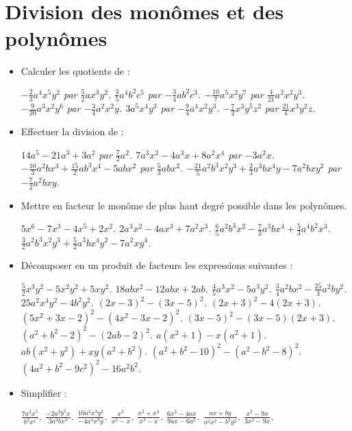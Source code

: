 \chapter{Division des monômes et des polynômes}

\begin{itemize}
\item Calculer les quotients de : 
\begin{itemize}
\it $-\frac23a^4x^5y^2$ par $\frac52ax^3y^2$.
\it $\frac35a^4b^2c^5$ par $-\frac34ab^2c^3$.
\it $-\frac{10}7a^5x^2y^7$ par $\frac{4}{21}a^2x^2y^3$. 
\it $-\frac9{20}a^3x^2y^6$ par $-\frac34a^2x^2y$.
\it $3a^5x^4y^3$ par $-\frac94a^4x^2y^3$. 
\it $-\frac72x^3y^5z^2$ par $\frac{21}4x^3y^2z$. 
\end{itemize}
\item Effectuer la division de : \begin{itemize}
\it $14a^5-21a^3+3a^2$ par $\frac72a^2$. 
\it $7a^3x^2-4a^3x+8a^2x^4$ par $-3a^2x$.
\it $-\frac{10}3 a^2bx^3+\frac{15}2ab^3x^4-5abx^2$ par $\frac53abx^2$.
\it $-\frac{21}5a^2b^3x^2y^3+\frac23a^3bx^4y-7a^2bxy^2$
par $-\frac72a^2bxy$.
\end{itemize}
\item Mettre en facteur le monôme de plus haut degré possible dans les polynômes. 
\begin{itemize}
\it $5x^6-7x^3-4x^5+2x^2$.
\it $2a^3x^2-4ax^3+7a^2x^3$.
\it $\frac65a^2b^3x^2-\frac72a^3bx^4+\frac53a^4b^2x^3$.
\it $\frac32a^2b^3x^2y^3+\frac52a^3bx^4y^2-7a^2xy^4$.
\end{itemize}
\item Décomposer en un produit de facteurs les expressions suivantes : 
\begin{itemize}
\it $\frac52x^3y^2-5x^2y^2+5xy^2$.
\it $18abx^2-12abx+2ab$.
\it $\frac45a^3x^2-5a^3y^2$.
\it $\frac34a^2bx^2-\frac{25}3a^2by^2$.
\it $25a^2x^4y^2-4b^2y^2$.
\it $(2x-3)^2-(3x-5)^2$.
\it $(2x+3)^2-4(2x+3)$.
\it $(5x^2+3x-2)^2-(4x^2-3x-2)^2$.
\it $(3x-5)^2-(3x-5)(2x+3)$.
\it $(a^2+b^2-2)^2-(2ab-2)^2$.
\it $a(x^2+1)-x(a^2+1)$.
\it $ab(x^2+y^2)+xy(a^2+b^2)$.
\it $(a^2+b^2-10)^2-(a^2-b^2-8)^2$.
\it $(4a^2+b^2-9c^2)^2-16a^2b^2$.
\end{itemize}
\item Simplifier : 
\begin{itemize}
\it $\frac{7a^2x^5}{b^2x^4}$.
\it $\frac{-2a^3b^2x}{3a^3bx^3}$.
\it $\frac{10a^2x^3y^2}{-4a^4x^3y}$.
\it $\frac{x^2}{x^2-x}$.
\it $\frac{x^2+x^3}{x^3-x}$.
\it $\frac{6x^2-4ax}{9ax-6a^2}$.
\it $\frac{ax+by}{a^2x^2-b^2y^2}$.
\it $\frac{x^3-9x}{3x^2-9x}$.

\end{itemize}
\end{itemize}
